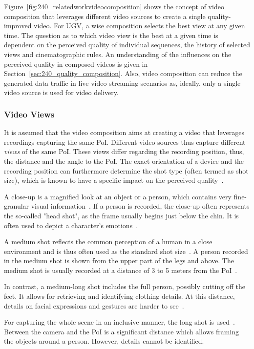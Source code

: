 Figure~\ref{fig:240_relatedworkvideocomposition} shows the concept of video composition that leverages different video sources to create a single quality-improved video.
For \ac{UGV}, a wise composition selects the best view at any given time.
The question as to which video view is the best at a given time is dependent on the perceived quality of individual sequences, the history of selected views and cinematographic rules.
An understanding of the influences on the perceived quality in composed videos is given in Section~\ref{sec:240_quality_composition}.
Also, video composition can reduce the generated data traffic in live video streaming scenarios as, ideally, only a single video source is used for video delivery.
\subsubsection{Video Views}
\label{sec:240_VideoViews}
It is assumed that the video composition aims at creating a video that leverages recordings capturing the same \ac{PoI}.
Different video sources thus capture different \emph{views} of the same \ac{PoI}.
These views differ regarding the recording position, thus, the distance and the angle to the \ac{PoI}.
The exact orientation of a device and the recording position can furthermore determine the shot type (often termed as shot size), which is known to have a specific impact on the perceived quality~\cite{Bowen2013,Manchel1990,Ward2003}.

A close-up is a magnified look at an object or a person, which contains very fine-granular visual information~\cite{Bowen2013}.
If a person is recorded, the close-up often represents the so-called "head shot", as the frame usually begins just below the chin.
It is often used to depict a character's emotions~\cite{Manchel1990}.

A medium shot reflects the common perception of a human in a close environment and is thus often used as the standard shot size~\cite{Bowen2013}. 
A person recorded in the medium shot is shown from the upper part of the legs and above.
The medium shot is usually recorded at a distance of 3 to 5 meters from the \ac{PoI}~\cite{Bowen2013}. 

In contrast, a medium-long shot includes the full person, possibly cutting off the feet.
It allows for retrieving and identifying clothing details.
At this distance, details on facial expressions and gestures are harder to see~\cite{Bowen2013}.

For capturing the whole scene in an inclusive manner, the long shot is used~\cite{Bowen2013}. 
Between the camera and the \ac{PoI} is a significant distance which allows framing the objects around a person.
However, details cannot be identified.

